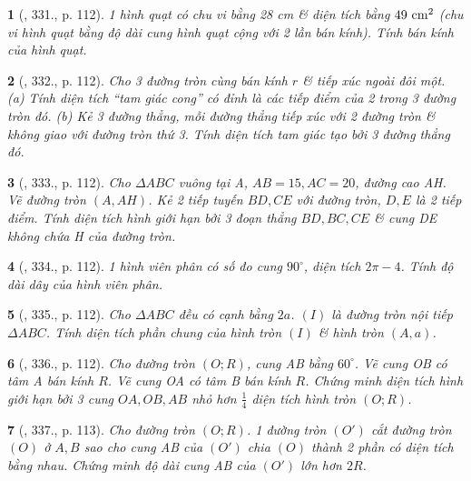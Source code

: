 \documentclass{article}
\newtheorem{baitoan}{}
\begin{document}
\begin{baitoan}[\cite{Binh_Toan_9_tap_2}, 331., p. 112]
	1 hình quạt có chu vi bằng {\rm28 cm} \& diện tích bằng $\rm49\ cm^2$ (chu vi hình quạt bằng độ dài cung hình quạt cộng với 2 lần bán kính). Tính bán kính của hình quạt.
\end{baitoan}

\begin{baitoan}[\cite{Binh_Toan_9_tap_2}, 332., p. 112]
	Cho 3 đường tròn cùng bán kính $r$ \& tiếp xúc ngoài đôi một. (a) Tính diện tích ``tam giác cong'' có đỉnh là các tiếp điểm của 2 trong 3 đường tròn đó. (b) Kẻ 3 đường thẳng, mỗi đường thẳng tiếp xúc với 2 đường tròn \& không giao với đường tròn thứ 3. Tính diện tích tam giác tạo bởi 3 đường thẳng đó.
\end{baitoan}

\begin{baitoan}[\cite{Binh_Toan_9_tap_2}, 333., p. 112]
	Cho $\Delta ABC$ vuông tại A, $AB = 15,AC = 20$, đường cao AH. Vẽ đường tròn $(A,AH)$. Kẻ 2 tiếp tuyến $BD,CE$ với đường tròn, $D,E$ là 2 tiếp điểm. Tính diện tích hình giới hạn bởi 3 đoạn thẳng $BD,BC,CE$ \& cung DE không chứa H của đường tròn.
\end{baitoan}

\begin{baitoan}[\cite{Binh_Toan_9_tap_2}, 334., p. 112]
	1 hình viên phân có số đo cung $90^\circ$, diện tích $2\pi - 4$. Tính độ dài dây của hình viên phân.
\end{baitoan}

\begin{baitoan}[\cite{Binh_Toan_9_tap_2}, 335., p. 112]
	Cho $\Delta ABC$ đều có cạnh bằng $2a$. $(I)$ là đường tròn nội tiếp $\Delta ABC$. Tính diện tích phần chung của hình tròn $(I)$ \& hình tròn $(A,a)$.
\end{baitoan}

\begin{baitoan}[\cite{Binh_Toan_9_tap_2}, 336., p. 112]
	Cho đường tròn $(O;R)$, cung AB bằng $60^\circ$. Vẽ cung OB có tâm A bán kính $R$. Vẽ cung OA có tâm B bán kính $R$. Chứng minh diện tích hình giới hạn bởi 3 cung $OA,OB,AB$ nhỏ hơn $\frac{1}{4}$ diện tích hình tròn $(O;R)$.
\end{baitoan}

\begin{baitoan}[\cite{Binh_Toan_9_tap_2}, 337., p. 113]
	Cho đường tròn $(O;R)$. 1 đường tròn $(O')$ cắt đường tròn $(O)$ ở $A,B$ sao cho cung AB của $(O')$ chia $(O)$ thành 2 phần có diện tích bằng nhau. Chứng minh độ dài cung AB của $(O')$ lớn hơn $2R$.
\end{baitoan}
\end{document}
